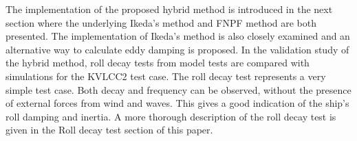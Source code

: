 \quad The implementation of the proposed hybrid method is introduced in
the next section where the underlying Ikeda's method and FNPF method are
both presented. The implementation of Ikeda's method is also closely
examined and an alternative way to calculate eddy damping is proposed.
In the validation study of the hybrid method, roll decay tests from
model tests are compared with simulations for the KVLCC2 test case. The
roll decay test represents a very simple test case. Both decay and
frequency can be observed, without the presence of external forces from
wind and waves. This gives a good indication of the ship's roll damping
and inertia. A more thorough description of the roll decay test is given
in the Roll decay test section of this paper.

    